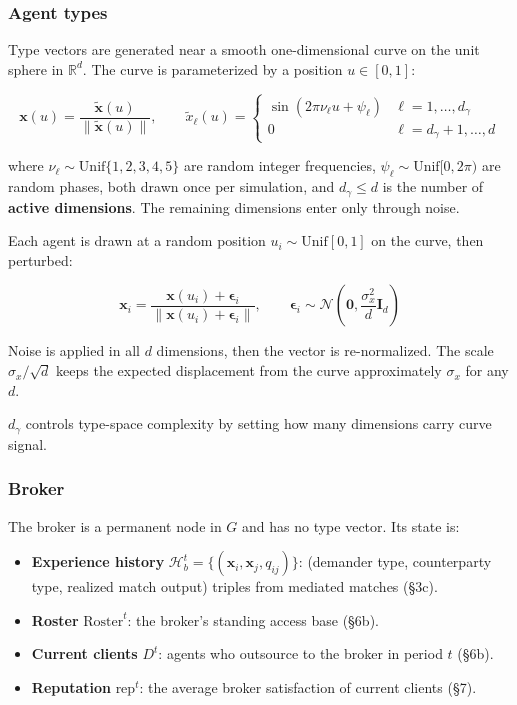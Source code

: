 \documentclass[11pt]{article}
\providecommand{\tightlist}{%
  \setlength{\itemsep}{0pt}\setlength{\parskip}{0pt}}
\begin{document}
\subsubsection{Agent types}\label{agent-types}

Type vectors are generated near a smooth one-dimensional curve on the unit sphere in \(\mathbb{R}^d\). The curve is parameterized by a position \(u \in [0, 1]\):

\[\mathbf{x}(u) = \frac{\tilde{\mathbf{x}}(u)}{\|\tilde{\mathbf{x}}(u)\|}, \qquad \tilde{x}_\ell(u) = \begin{cases} \sin(2\pi \nu_\ell u + \psi_\ell) & \ell = 1, \ldots, d_\gamma \\ 0 & \ell = d_\gamma+1, \ldots, d \end{cases}\]

where \(\nu_\ell \sim \mathrm{Unif}\{1, 2, 3, 4, 5\}\) are random integer frequencies, \(\psi_\ell \sim \mathrm{Unif}[0, 2\pi)\) are random phases, both drawn once per simulation, and \(d_\gamma \leq d\) is the number of \textbf{active dimensions}. The remaining dimensions enter only through noise.

Each agent is drawn at a random position \(u_i \sim \mathrm{Unif}[0,1]\) on the curve, then perturbed:

\[\mathbf{x}_i = \frac{\mathbf{x}(u_i) + \boldsymbol{\epsilon}_i}{\|\mathbf{x}(u_i) + \boldsymbol{\epsilon}_i\|}, \qquad \boldsymbol{\epsilon}_i \sim \mathcal{N}\!\left(\mathbf{0}, \frac{\sigma_x^2}{d} \mathbf{I}_d\right)\]

Noise is applied in all \(d\) dimensions, then the vector is re-normalized. The scale \(\sigma_x / \sqrt{d}\) keeps the expected displacement from the curve approximately \(\sigma_x\) for any \(d\).

\(d_\gamma\) controls type-space complexity by setting how many dimensions carry curve signal.

\subsubsection{Broker}\label{broker}

The broker is a permanent node in \(G\) and has no type vector. Its state is:

\begin{itemize}
\tightlist
\item
  \textbf{Experience history} \(\mathcal{H}_b^t = \{(\mathbf{x}_i, \mathbf{x}_j, q_{ij})\}\): (demander type, counterparty type, realized match output) triples from mediated matches (§3c).
\item
  \textbf{Roster} \(\text{Roster}^t\): the broker's standing access base (§6b).
\item
  \textbf{Current clients} \(D^t\): agents who outsource to the broker in period \(t\) (§6b).
\item
  \textbf{Reputation} \(\text{rep}^t\): the average broker satisfaction of current clients (§7).
\end{itemize}
\end{document}
